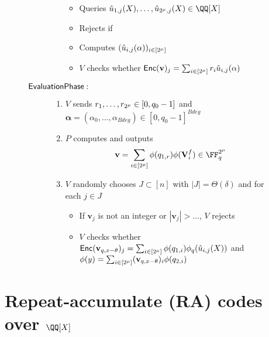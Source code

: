 \documentclass[11pt,letterpaper,usenames,dvipsnames]{article}
\begin{document}
\begin{figure}[H]
\begin{framed}
\begin{description}
\begin{enumerate}
\begin{itemize}
							\item Queries $\hat{u}_{1,j}(X), \ldots, \hat{u}_{\size, j}(X)\in \QQ[X]$
							\item Rejects if
							\item Computes $(\hat{u}_{i,j}(\mathbf \alpha))_{i\in[2^\mu]}$
							\item $V$ checks whether $\mathsf{Enc}(\mathbf v)_j=\sum_{i\in[2^\mu]}r_i\hat{u}_{i,j}(\mathbf{\alpha})$
						\end{itemize}
				\end{enumerate}
		\item[$\mathsf{Evaluation Phase}:$]				
				\begin{enumerate}
					\item $V$ sends $r_1, \ldots, r_{2^\mu}\in[0, q_0-1]$ and $\mathbf \alpha=(\alpha_0, \ldots, \alpha_{Bdeg})\in[0, q_0-1]^{Bdeg}$
					\item $P$ computes and outputs 
					$$\mathbf{v}=\sum_{i\in[\size]}\phi(q_{1,r})\phi(\matrixV^f_i)\in \FF_q^{\size}$$
					\item $V$ randomly chooses $J\subset[n]$ with $|J|=\Theta(\delta)$ and for each $j\in J$
					\begin{itemize}
						\item If $\mathbf v_j$ is not an integer or $|\mathbf v_j|>...$, $V$ rejects
						\item $V$ checks whether $\mathsf{Enc}(\mathbf v_{q, x-\theta})_j=\sum_{i\in[2^\mu]}\phi(q_{1,i})\phi_q(\hat{u}_{i,j}(X))$ and $\phi(y)=\sum_{i\in[2^\mu]}(\mathbf v_{q, x-\theta})_i\phi(q_{2,i})$
					\end{itemize}
				\end{enumerate}
		\end{description}		
	\end{framed}
\end{figure}

\section{Repeat-accumulate (RA) codes over $\QQ[X]$}
\label{sec:ra-codes} 

\renewcommand*{\bibfont}{\small}
\printbibliography
\end{document}
